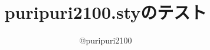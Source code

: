\documentclass{jsarticle}
\begin{document}
\title{\textsf{puripuri2100.sty}のテスト}
\author{@puripuri2100}
\date{\puritoday}
\maketitle

\end{document}
